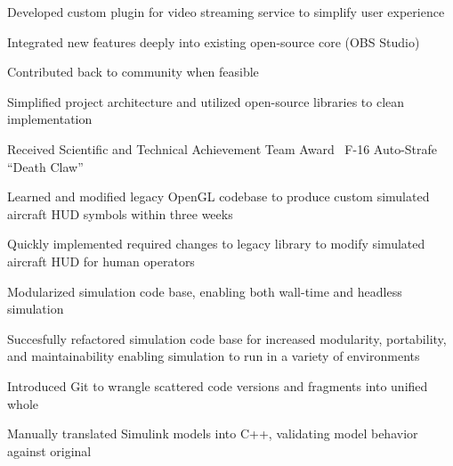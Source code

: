 \documentclass[letterpaper]{deedy-resume}
\newcommand{\experiencespace}{\vspace{2em}}
\begin{document}
\begin{minipage}[t]{0.66\textwidth}
    \begin{compactitem}
        \item Developed custom plugin for video streaming service to simplify user experience
        \item Integrated new features deeply into existing open-source core (OBS Studio)
        \item Contributed back to community when feasible
        \item Simplified project architecture and utilized open-source libraries to clean implementation
    \end{compactitem}
    \experiencespace

    \begin{compactitem}
        \item Received Scientific and Technical Achievement Team Award \textemdash\ F-16 Auto-Strafe ``Death
            Claw''
        \item Learned and modified legacy OpenGL codebase to produce custom simulated aircraft HUD symbols
            within three weeks
        \item Quickly implemented required changes to legacy library to modify simulated aircraft HUD for
            human operators
        \item Modularized simulation code base, enabling both wall-time and headless simulation
        \item Succesfully refactored simulation code base for increased modularity, portability, and
            maintainability enabling simulation to run in a variety of environments
        \item Introduced Git to wrangle scattered code versions and fragments into unified whole
        \item Manually translated Simulink models into C++, validating model behavior against original
    \end{compactitem}
    \experiencespace


\end{minipage}
\end{document}
